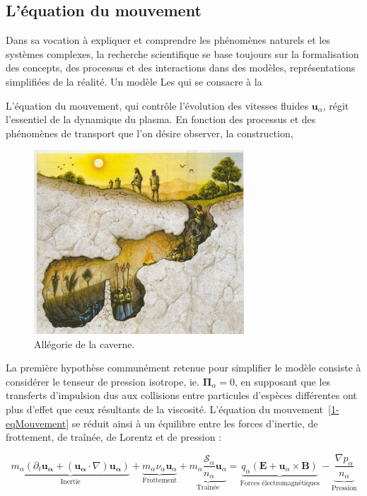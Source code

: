 \label{ApproximationsEqMvt}
\begin{refsection}
\section{L'équation du mouvement}

Dans sa vocation à expliquer et comprendre les phénomènes naturels et les
systèmes complexes, la recherche scientifique se base toujours sur la
formalisation des concepts, des processus et des interactions dans des
modèles, représentations simplifiées de la réalité. Un modèle Les  qui se
consacre à la 

L'équation du mouvement, qui contrôle l'évolution des vitesses fluides $\mathbf
u_\alpha$, régit l'essentiel de la dynamique du plasma. En fonction des
processus et des phénomènes de transport que l'on désire observer, la construction,

\begin{figure}[!htbp]
    \centering
	\includegraphics[width=0.7\textwidth]{figures/1-cave.jpg}
	\caption{Allégorie de la caverne.}\label{SOL}
\end{figure}

La première hypothèse communément retenue pour simplifier le
modèle consiste à considérer le tenseur de pression isotrope, ie.
$\boldsymbol{\Pi}_\alpha=0$, en supposant que les transferts d'impulsion dus
aux collisions entre particules d'espèces différentes ont plus d'effet que
ceux résultants de la viscosité. L'équation du
mouvement~\eqref{1-eqMouvement} se réduit ainsi à un équilibre entre les forces
d'inertie, de frottement, de traînée, de Lorentz et de pression :

\begin{equation}
\label{1-eqBilanForce}
\underbrace{m_\alpha \left(\partial_t \mathbf{u_\alpha} +
(\mathbf{u_\alpha}\cdot\nabla)\mathbf{u_\alpha}\right)}_\text{Inertie}
+\underbrace{m_\alpha\nu_\alpha\mathbf
u_\alpha}_\text{Frottement}+\underbrace{m_\alpha
\frac{\mathcal S_\alpha}{n_\alpha}\mathbf
u_\alpha}_\text{Traînée}=\underbrace{{q_\alpha}\left(\mathbf
E+\mathbf u_\alpha\times \mathbf B\right)}_\text{Forces électromagnétiques}
-\underbrace{\frac{\nabla p_\alpha}{n_\alpha}}_\text{Pression}
\end{equation}
 

\end{refsection}
